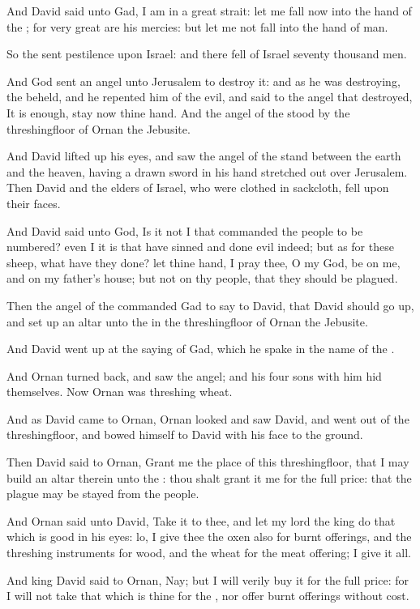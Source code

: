 \Verse And David said unto Gad, I am in a great strait: let me fall now into the hand of the \LORD; for very great are his mercies: but let me not fall into the hand of man.

\Verse So the \LORD sent pestilence upon Israel: and there fell of Israel seventy thousand men.

\Verse And God sent an angel unto Jerusalem to destroy it: and as he was destroying, the \LORD beheld, and he repented him of the evil, and said to the angel that destroyed, It is enough, stay now thine hand.  And the angel of the \LORD stood by the threshingfloor of Ornan the Jebusite.

\Verse And David lifted up his eyes, and saw the angel of the \LORD stand between the earth and the heaven, having a drawn sword in his hand stretched out over Jerusalem. Then David and the elders of Israel, who were clothed in sackcloth, fell upon their faces.

\Verse And David said unto God, Is it not I that commanded the people to be numbered? even I it is that have sinned and done evil indeed; but as for these sheep, what have they done? let thine hand, I pray thee, O \LORD my God, be on me, and on my father's house; but not on thy people, that they should be plagued.

\Verse Then the angel of the \LORD commanded Gad to say to David, that David should go up, and set up an altar unto the \LORD in the threshingfloor of Ornan the Jebusite.

\Verse And David went up at the saying of Gad, which he spake in the name of the \LORD.

\Verse And Ornan turned back, and saw the angel; and his four sons with him hid themselves. Now Ornan was threshing wheat.

\Verse And as David came to Ornan, Ornan looked and saw David, and went out of the threshingfloor, and bowed himself to David with his face to the ground.

\Verse Then David said to Ornan, Grant me the place of this threshingfloor, that I may build an altar therein unto the \LORD: thou shalt grant it me for the full price: that the plague may be stayed from the people.

\Verse And Ornan said unto David, Take it to thee, and let my lord the king do that which is good in his eyes: lo, I give thee the oxen also for burnt offerings, and the threshing instruments for wood, and the wheat for the meat offering; I give it all.

\Verse And king David said to Ornan, Nay; but I will verily buy it for the full price: for I will not take that which is thine for the \LORD, nor offer burnt offerings without cost.

